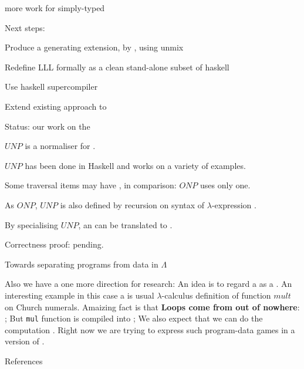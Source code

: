 \documentclass[12pt,fleqn,landscape]{article}
\begin{document}
\begin{slide}{more work for simply-typed \lc }

\vair\vair

Next steps:
\vair

  \bi
  \ii Produce a generating extension,  by , using {\sc unmix}
\vair

  \ii Redefine LLL formally as a clean stand-alone subset of {\sc haskell}
\vair

  \ii Use {\sc haskell} supercompiler
\vair

  \ii Extend existing approach to 
  \ei
\end{slide}




\begin{slide}{Status:  our work on the  \lc }

\be
\ii $UNP$ is a normaliser for .
\vair

\ii $UNP$ has been done in {\sc Haskell} and works on a variety of examples.
\vair

\ii Some traversal items may have , in comparison: $ONP$ uses only one.
\vair

\ii As $ONP$, $UNP$ is also defined  by recursion on syntax of $\lambda$-expression .
\vair

\ii By specialising $UNP$, an  can be translated to .
\vair

\ii Correctness proof: pending.
\ee

\end{slide}



\begin{slide}{Towards separating programs from data in $\Lambda$}

Also we have a one more direction for research:
\be
\ii An idea is to regard a  as a
  .
\ii An interesting example in this case a is usual $\lambda$-calculus definition of function $mult$
  on Church numerals.
\ii Amaizing fact is that \textbf{Loops come from out of nowhere}:
  \bi
  \ii {};
  \ii But {\tt mul} function is compiled into ;
  \ii We also expect that we can do the computation .
  \ei
\ii Right now we are trying to express such program-data games in a 
  version of . 
\ee

\end{slide}

\begin{slide}{References}

\end{slide}
\end{document}
